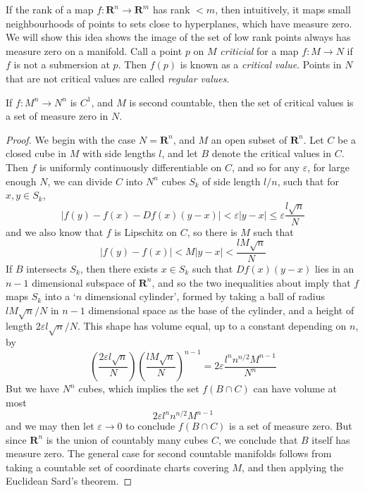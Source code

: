 If the rank of a map $f: \mathbf{R}^n \to \mathbf{R}^m$ has rank $< m$, then intuitively, it maps small neighbourhoods of points to sets close to hyperplanes, which have measure zero. We will show this idea shows the image of the set of low rank points always has measure zero on a manifold. Call a point $p$ on $M$ \emph{criticial} for a map $f:M \to N$ if $f$ is not a submersion at $p$. Then $f(p)$ is known as a \emph{critical value}. Points in $N$ that are not critical values are called \emph{regular values}.

\begin{theorem}[Sard]
    If $f: M^n \to N^n$ is $C^1$, and $M$ is second countable, then the set of critical values is a set of measure zero in $N$.
\end{theorem}
\begin{proof}
    We begin with the case $N = \mathbf{R}^n$, and $M$ an open subset of $\mathbf{R}^n$. Let $C$ be a closed cube in $M$ with side lengths $l$, and let $B$ denote the critical values in $C$. Then $f$ is uniformly continuously differentiable on $C$, and so for any $\varepsilon$, for large enough $N$, we can divide $C$ into $N^n$ cubes $S_k$ of side length $l/n$, such that for $x,y \in S_k$,
    \[ |f(y) - f(x) - Df(x)(y - x)| < \varepsilon |y - x| \leq \varepsilon \frac{l \sqrt{n}}{N} \]
    and we also know that $f$ is Lipschitz on $C$, so there is $M$ such that
    \[ |f(y) - f(x)| < M|y - x| < \frac{lM \sqrt{n}}{N} \]
    If $B$ intersects $S_k$, then there exists $x \in S_k$ such that $Df(x)(y-x)$ lies in an $n-1$ dimensional subspace of $\mathbf{R}^n$, and so the two inequalities about imply that $f$ maps $S_k$ into a `$n$ dimensional cylinder', formed by taking a ball of radius $lM \sqrt{n}/N$ in $n-1$ dimensional space as the base of the cylinder, and a height of length $2 \varepsilon l\sqrt{n}/N$. This shape has volume equal, up to a constant depending on $n$, by
    \[ \left( \frac{2 \varepsilon l \sqrt{n}}{N} \right) \left( \frac{lM \sqrt{n}}{N} \right)^{n-1} = 2 \varepsilon \frac{l^n n^{n/2} M^{n-1}}{N^n} \]
    But we have $N^n$ cubes, which implies the set $f(B \cap C)$ can have volume at most
    \[ 2 \varepsilon l^n n^{n/2} M^{n-1} \]
    and we may then let $\varepsilon \to 0$ to conclude $f(B \cap C)$ is a set of measure zero. But since $\mathbf{R}^n$ is the union of countably many cubes $C$, we conclude that $B$ itself has measure zero. The general case for second countable manifolds follows from taking a countable set of coordinate charts covering $M$, and then applying the Euclidean Sard's theorem.
\end{proof}

